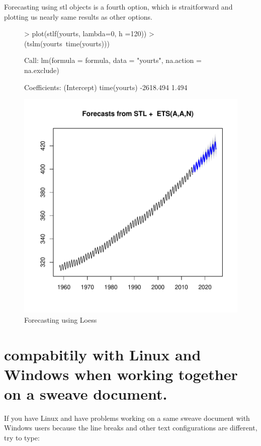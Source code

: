 \documentclass[11pt, a4paper]{article} %
\begin{document}
Forecasting using stl objects is a fourth option, which is straitforward and plotting us nearly same results as other options. 
\begin{figure}[H]
\centering
\begin{Schunk}
\begin{Sinput}
> plot(stlf(yourts, lambda=0, h =120))
> (tslm(yourts~time(yourts)))
\end{Sinput}
\begin{Soutput}
Call:
lm(formula = formula, data = "yourts", na.action = na.exclude)

Coefficients:
 (Intercept)  time(yourts)  
   -2618.494         1.494  
\end{Soutput}
\end{Schunk}
\includegraphics{alleselena-075}
\caption{Forecasting using Loess}
\end{figure}




\section{compabitily with Linux and Windows when working together on a sweave document.}
If you have Linux and have problems working on a same sweave document with Windows users because the line breaks and other text configurations are different, try to type:
\end{document}
